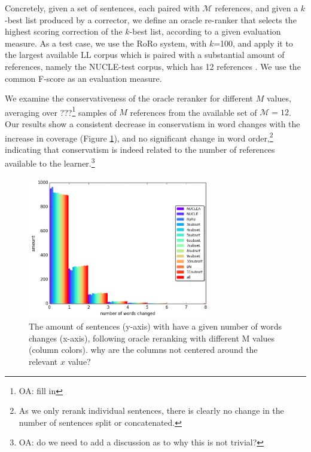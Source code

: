 \documentclass[letterpaper, 11pt]{article}
\newcommand{\com}[1]{}
\newcommand{\oa}[1]{\footnote{\color{red}OA: #1}}
\newcommand{\oamod}[1]{{\color{red}#1}}
\begin{document}
Concretely, given a set of sentences, each paired with $\mathcal{M}$ references, and given
a $k$-best list produced by a corrector, we define an oracle re-ranker that selects the highest
scoring correction of the $k$-best list, according to a given evaluation measure.
As a test case, we use the RoRo system, with $k$=100, and apply it to the 
largest available LL corpus which is paired with a substantial amount of references,
namely the NUCLE-test corpus, which has 12 references \cite{bryant2015far}. We use
the common F-score as an evaluation measure. 

We examine the conservativeness of the oracle reranker for different $M$ values, averaging
over ???\oa{fill in} samples of $M$ references from the available set of $\mathcal{M}=12$.
Our results show a consistent decrease in conservatism in
word changes with the increase in coverage (Figure \ref{fig:reranking_word_change}),
and no significant change in word order,\footnote{As we only rerank individual sentences,
  there is clearly no change in the number of sentences split or concatenated.}
indicating that conservatism is indeed related to the number of references available
to the learner.\oa{do we need to add a discussion as to why this is not trivial?}



\begin{figure}
	\vspace{-1em}
	\includegraphics[width=8cm]{words_differences_hist_reranking}
	\caption{The amount of sentences (y-axis) with have a given number of words changes (x-axis), following oracle reranking with different M values (column colors). \oamod{why are the columns not centered around the relevant
            $x$ value?}
		\label{fig:reranking_word_change}
	}
	\vspace{-0.5cm}
\end{figure}
\end{document}
